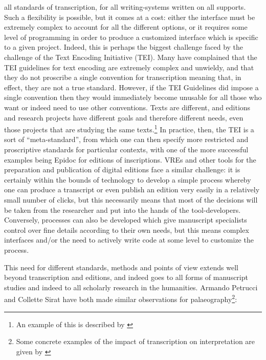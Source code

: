 all standards of transcription, for all writing-systems written on all
supports. Such a flexibility is possible, but it comes at a cost: either the
interface must be extremely complex to account for all the different options,
or it requires some level of programming in order to produce a customized
interface which is specific to a given project. Indeed, this is perhaps the
biggest challenge faced by the challenge of the Text Encoding Initiative (TEI).
Many have complained that the TEI guidelines for text encoding are extremely
complex and unwieldy, and that they do not proscribe a single convention for
transcription meaning that, in effect, they are not a true standard. However,
if the TEI Guidelines did impose a single convention then they would
immediately become unusable for all those who want or indeed need to use other
conventions. Texts are different, and editions and research projects have
different goals and therefore different needs, even those projects that are
studying the same texts.\footnote{An example of this is described by
\cite{stokes2010project}}  In practice, then, the TEI is a sort of
“meta-standard”, from which one can then specify more restricted and
proscriptive standards for particular contexts, with one of the more successful
examples being Epidoc for editions of inscriptions.\cite{epidoc} VREs and other
tools for the preparation and publication of digital editions face a similar
challenge: it is certainly within the bounds of technology to develop a simple
process whereby one can produce a transcript or even publish an edition very
easily in a relatively small number of clicks, but this necessarily means that
most of the decisions will be taken from the researcher and put into the hands
of the tool-developers. Conversely, processes can also be developed which give
manuscript specialists control over fine details according to their own needs,
but this means complex interfaces and/or the need to actively write code at
some level to customize the process.

This need for different standards, methods and points of view extends well
beyond transcription and editions, and indeed goes to all forms of manuscript
studies and indeed to all scholarly research in the humanities.  Armando
Petrucci and Collette Sirat have both made similar observations for
palaeography\footnote{Some concrete examples of the impact of transcription on
interpretation are given by \cite[pg. 50-54]{stokes2020b}}:

